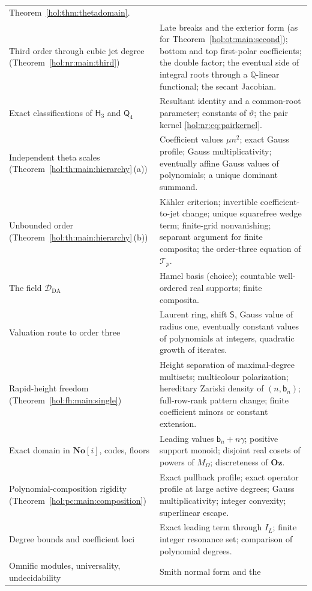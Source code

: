 \documentclass[11pt]{article}
\numberwithin{equation}{section}
\theoremstyle{definition}
\theoremstyle{remark}
\newcommand{\Q}{\mathbb Q}
\newcommand{\No}{\mathbf{No}}
\newcommand{\Oz}{\mathbf{Oz}}
\begin{document}
\begin{longtable}{@{}>{\raggedright\arraybackslash}p{}
                    >{\raggedright\arraybackslash}p{}@{}}
Theorem~\ref{hol:thm:thetadomain}.\\
Third order through cubic jet degree (Theorem~\ref{hol:nr:main:third}) &
Late breaks and the exterior form (as for Theorem~\ref{hol:ot:main:second});
bottom and top first-polar coefficients; the double factor; the eventual side
of integral roots through a $\Q$-linear functional; the secant Jacobian.\\
Exact classifications of $\mathsf H_3$ and $\mathsf Q_4$ & Resultant identity
and a common-root parameter; constants of $\vartheta$; the pair kernel
\eqref{hol:nr:eq:pairkernel}.\\
Independent theta scales (Theorem~\ref{hol:th:main:hierarchy}\,(a)) &
Coefficient values $\mu n^2$; exact Gauss profile; Gauss multiplicativity;
eventually affine Gauss values of polynomials; a unique dominant summand.\\
Unbounded order (Theorem~\ref{hol:th:main:hierarchy}\,(b)) & K\"ahler
criterion; invertible coefficient-to-jet change; unique squarefree wedge term;
finite-grid nonvanishing; separant argument for finite composita; the order-three
equation of $\mathcal T_p$.\\
The field $\mathcal D_{\mathrm{DA}}$ & Hamel basis (choice); countable well-ordered
real supports; finite composita.\\
Valuation route to order three & Laurent ring, shift $\mathsf S$, Gauss value of
radius one, eventually constant values of polynomials at integers,
quadratic growth of iterates.\\
Rapid-height freedom (Theorem~\ref{hol:fh:main:single}) & Height separation of
maximal-degree multisets; multicolour polarization; hereditary Zariski
density of $(n,\mathsf b_n)$; full-row-rank pattern change; finite coefficient
minors or constant extension.\\
Exact domain in $\No[i]$, codes, floors & Leading values $\mathsf b_n+n\gamma$;
positive support monoid; disjoint real cosets of powers of $M_\Omega$;
discreteness of $\Oz$.\\
Polynomial-composition rigidity (Theorem~\ref{hol:pc:main:composition}) &
Exact pullback profile; exact operator profile at large active degrees;
Gauss multiplicativity; integer convexity; superlinear escape.\\
Degree bounds and coefficient loci & Exact leading term through $I_L$; finite
integer resonance set; comparison of polynomial degrees.\\
Omnific modules, universality, undecidability & Smith normal form and the

\end{longtable}
\end{document}
